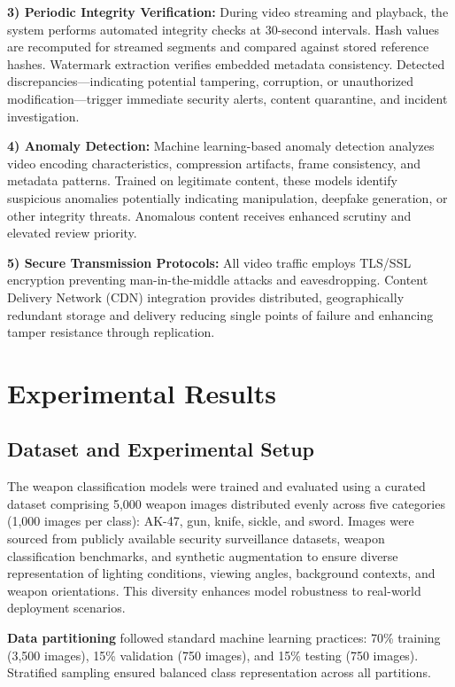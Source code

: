 \documentclass[conference]{IEEEtran}
\begin{document}
\textbf{3) Periodic Integrity Verification:} During video streaming and playback, the system performs automated integrity checks at 30-second intervals. Hash values are recomputed for streamed segments and compared against stored reference hashes. Watermark extraction verifies embedded metadata consistency. Detected discrepancies—indicating potential tampering, corruption, or unauthorized modification—trigger immediate security alerts, content quarantine, and incident investigation.

\textbf{4) Anomaly Detection:} Machine learning-based anomaly detection analyzes video encoding characteristics, compression artifacts, frame consistency, and metadata patterns. Trained on legitimate content, these models identify suspicious anomalies potentially indicating manipulation, deepfake generation, or other integrity threats. Anomalous content receives enhanced scrutiny and elevated review priority.

\textbf{5) Secure Transmission Protocols:} All video traffic employs TLS/SSL encryption preventing man-in-the-middle attacks and eavesdropping. Content Delivery Network (CDN) integration provides distributed, geographically redundant storage and delivery reducing single points of failure and enhancing tamper resistance through replication.

\section{Experimental Results}

\subsection{Dataset and Experimental Setup}

The weapon classification models were trained and evaluated using a curated dataset comprising 5,000 weapon images distributed evenly across five categories (1,000 images per class): AK-47, gun, knife, sickle, and sword. Images were sourced from publicly available security surveillance datasets, weapon classification benchmarks, and synthetic augmentation to ensure diverse representation of lighting conditions, viewing angles, background contexts, and weapon orientations. This diversity enhances model robustness to real-world deployment scenarios.

\textbf{Data partitioning} followed standard machine learning practices: 70\% training (3,500 images), 15\% validation (750 images), and 15\% testing (750 images). Stratified sampling ensured balanced class representation across all partitions.
\end{document}
